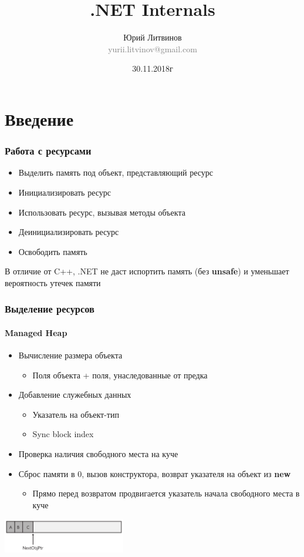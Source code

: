 \documentclass[xetex,mathserif,serif]{beamer}
\title{.NET Internals}
\author[Юрий Литвинов]{Юрий Литвинов\\\small{\textcolor{gray}{yurii.litvinov@gmail.com}}}
\date{30.11.2018г}
\begin{document}
	\frame{\titlepage}

	\section{Введение}

	\begin{frame}
		\frametitle{Работа с ресурсами}
		\begin{itemize}
			\item Выделить память под объект, представляющий ресурс
			\item Инициализировать ресурс
			\item Использовать ресурс, вызывая методы объекта
			\item Деинициализировать ресурс
			\item Освободить память
		\end{itemize}
		В отличие от C++, .NET не даст испортить память (без \textbf{unsafe}) и уменьшает вероятность утечек памяти
	\end{frame}

	\begin{frame}
		\frametitle{Выделение ресурсов}
		\framesubtitle{Managed Heap}
		\begin{itemize}
			\item Вычисление размера объекта
			\begin{itemize}
				\item Поля объекта + поля, унаследованные от предка
			\end{itemize}
			\item Добавление служебных данных
			\begin{itemize}
				\item Указатель на объект-тип
				\item Sync block index
			\end{itemize}
			\item Проверка наличия свободного места на куче
			\item Сброс памяти в 0, вызов конструктора, возврат указателя на объект из \textbf{new}
			\begin{itemize}
				\item Прямо перед возвратом продвигается указатель начала свободного места в куче
			\end{itemize}
		\end{itemize}
		\begin{center}
			\includegraphics[width=0.4\textwidth]{heapAllocation.png}
		\end{center}
	\end{frame}
\end{document}
